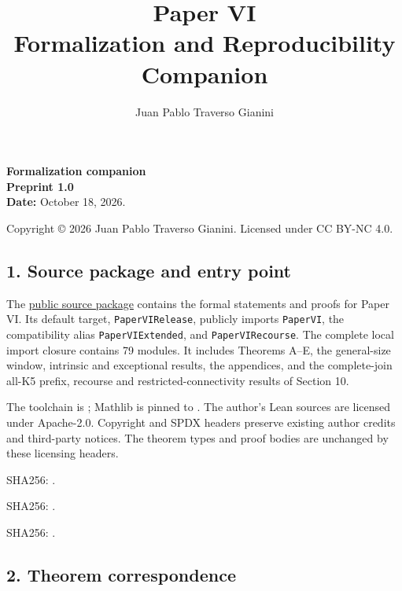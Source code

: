 \documentclass[english,11pt,a4paper]{article}
\title{Paper VI\\Formalization and Reproducibility Companion}
\author{Juan Pablo Traverso Gianini}
\date{}
\begin{document}
\raggedbottom\maketitle
\textbf{Formalization companion}\\
\textbf{Preprint 1.0}\\
\textbf{Date:} October 18, 2026.

Copyright © 2026 Juan Pablo Traverso Gianini. Licensed under CC BY-NC 4.0.

\subsection{1. Source package and entry
point}\label{source-package-and-entry-point}

The
\href{https://github.com/jtraverso/erdos-81-chordal-clique-partitions/tree/main/preprints/PAPER_VI/05_formalization}{public
source package} contains the formal statements and proofs for Paper VI.
Its default target, \texttt{PaperVIRelease}, publicly imports
\texttt{PaperVI}, the compatibility alias \texttt{PaperVIExtended}, and
\texttt{PaperVIRecourse}. The complete local import closure contains 79
modules. It includes Theorems A--E, the general-size window, intrinsic
and exceptional results, the appendices, and the complete-join all-K5
prefix, recourse and restricted-connectivity results of Section 10.

The toolchain is ; Mathlib is pinned to
. The author's Lean
sources are licensed under Apache-2.0. Copyright and SPDX headers
preserve existing author credits and third-party notices. The theorem
types and proof bodies are unchanged by these licensing headers.

 SHA256:
.

 SHA256:
.

SHA256:
.

\subsection{2. Theorem correspondence}\label{theorem-correspondence}
\end{document}
